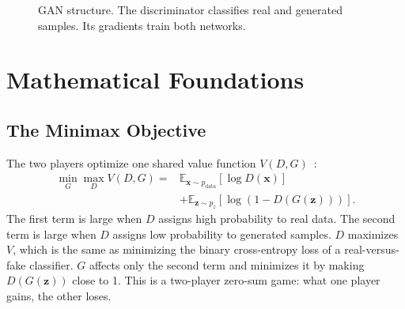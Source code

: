 \documentclass[conference]{IEEEtran}
\newcommand{\E}{\mathbb{E}}
\newcommand{\pdata}{p_{\mathrm{data}}}
\begin{document}
\begin{figure}[t]
\centering
{}
\caption{GAN structure. The discriminator classifies real and generated samples. Its gradients train both networks.}
\label{fig:gan}
\end{figure}

\section{Mathematical Foundations}
\subsection{The Minimax Objective}
The two players optimize one shared value function $V(D,G)$~\cite[Eq.~1]{goodfellow2014}:
\begin{align}
\min_G\max_D V(D,G)={}&\E_{\mathbf{x}\sim\pdata}\!\left[\log D(\mathbf{x})\right]\nonumber\\
&+\E_{\mathbf{z}\sim p_z}\!\left[\log\left(1-D(G(\mathbf{z}))\right)\right].
\label{eq:minimax}
\end{align}
The first term is large when $D$ assigns high probability to real data. The second term is large when $D$ assigns low probability to generated samples. $D$ maximizes $V$, which is the same as minimizing the binary cross-entropy loss of a real-versus-fake classifier. $G$ affects only the second term and minimizes it by making $D(G(\mathbf{z}))$ close to 1. This is a two-player zero-sum game: what one player gains, the other loses.
\end{document}
